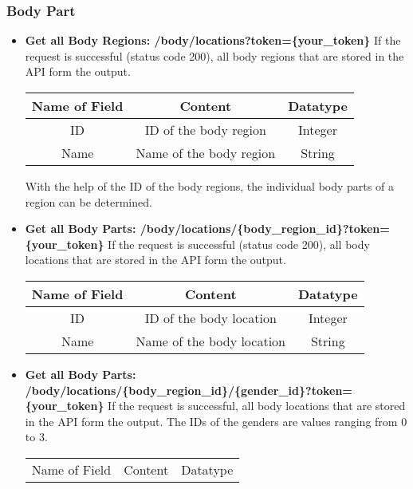 \subsubsection{Body Part}
\begin{itemize}
	\item \textbf{Get all Body Regions:  /body/locations?token=\{your\_token\}}
	\newline
	If the request is successful (status code 200), all body regions that are stored in the API form the output.
		\begin{center}
			\begin{tabular}{ | c| c| c | } 
  				\hline
  				Name of Field& Content & Datatype \\ 
  				\hline
  				ID & ID of the body region & Integer \\ 
  				\hline
 				Name & Name of the body region & String \\ 
  				\hline
			\end{tabular}
		\end{center}
With the help of the ID of the body regions, the individual body parts of a region can be determined.
	\item \textbf{Get all Body Parts:  /body/locations/\{body\_region\_id\}?token=\{your\_token\}}
	\newline
If the request is successful (status code 200), all body locations that are stored in the API form the output.
		\begin{center}
			\begin{tabular}{ | c| c| c | } 
  				\hline
  				Name of Field& Content & Datatype \\ 
  				\hline
  				ID & ID of the body location & Integer \\ 
  				\hline
 				Name & Name of the body location & String \\ 
  				\hline
			\end{tabular}
		\end{center}
	\item \textbf{Get all Body Parts:  /body/locations/\{body\_region\_id\}/\{gender\_id\}?token=\{your\_token\}}
	\newline
If the request is successful, all body locations that are stored in the API form the output. The IDs of the genders are values ranging from 0 to 3. 
		\begin{center}
		\scriptsize
			\begin{tabular}{ | c| c| c | } 
  				\hline
  				Name of Field& Content & Datatype \\ 

\end{tabular}
\end{center}
\end{itemize}
